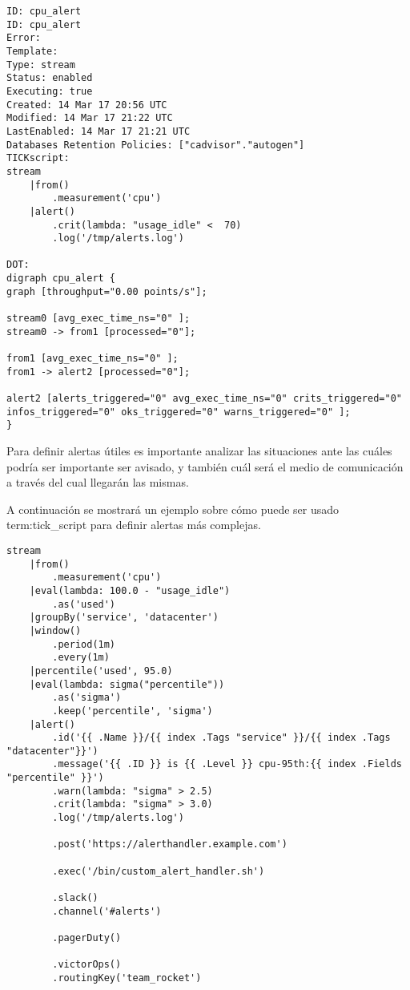 \begin{lstlisting}
ID: cpu_alert
ID: cpu_alert
Error: 
Template: 
Type: stream
Status: enabled
Executing: true
Created: 14 Mar 17 20:56 UTC
Modified: 14 Mar 17 21:22 UTC
LastEnabled: 14 Mar 17 21:21 UTC
Databases Retention Policies: ["cadvisor"."autogen"]
TICKscript:
stream
    |from()
        .measurement('cpu')
    |alert()
        .crit(lambda: "usage_idle" <  70)
        .log('/tmp/alerts.log')

DOT:
digraph cpu_alert {
graph [throughput="0.00 points/s"];

stream0 [avg_exec_time_ns="0" ];
stream0 -> from1 [processed="0"];

from1 [avg_exec_time_ns="0" ];
from1 -> alert2 [processed="0"];

alert2 [alerts_triggered="0" avg_exec_time_ns="0" crits_triggered="0" infos_triggered="0" oks_triggered="0" warns_triggered="0" ];
}
\end{lstlisting}

Para definir alertas útiles es importante analizar las situaciones ante las
cuáles podría ser importante ser avisado, y también cuál será el medio de 
comunicación a través del cual llegarán las mismas.

A continuación se mostrará un ejemplo sobre cómo puede ser usado
\gls{term:tick_script} para definir alertas más complejas.

\begin{lstlisting}
stream
    |from()
        .measurement('cpu')
    |eval(lambda: 100.0 - "usage_idle")
        .as('used')
    |groupBy('service', 'datacenter')
    |window()
        .period(1m)
        .every(1m)
    |percentile('used', 95.0)
    |eval(lambda: sigma("percentile"))
        .as('sigma')
        .keep('percentile', 'sigma')
    |alert()
        .id('{{ .Name }}/{{ index .Tags "service" }}/{{ index .Tags "datacenter"}}')
        .message('{{ .ID }} is {{ .Level }} cpu-95th:{{ index .Fields "percentile" }}')
        .warn(lambda: "sigma" > 2.5)
        .crit(lambda: "sigma" > 3.0)
        .log('/tmp/alerts.log')

        .post('https://alerthandler.example.com')

        .exec('/bin/custom_alert_handler.sh')

        .slack()
        .channel('#alerts')

        .pagerDuty()

        .victorOps()
        .routingKey('team_rocket')
\end{lstlisting}


